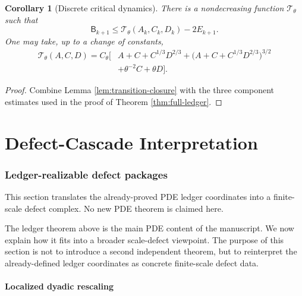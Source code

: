 \documentclass[11pt]{article}
\numberwithin{equation}{section}
\newtheorem{corollary}[theorem]{Corollary}
\newcommand{\Bbad}{\mathsf B}
\begin{document}
\begin{corollary}[Discrete critical dynamics]\label{cor:discrete-dynamics}
There is a nondecreasing function $\mathcal T_\theta$ such that
\[
\Bbad_{k+1}\leq \mathcal T_\theta(A_k,C_k,D_k)-2E_{k+1}.
\]
One may take, up to a change of constants,
\begin{align*}
\mathcal T_\theta(A,C,D)
=C_\theta\Big[&A+C+C^{1/3}D^{2/3}
+\big(A+C+C^{1/3}D^{2/3}\big)^{3/2}\\
&+\theta^{-2}C+\theta D\Big].
\end{align*}
\end{corollary}

\begin{proof}
Combine Lemma \ref{lem:transition-closure} with the three component estimates used in the proof of Theorem \ref{thm:full-ledger}.
\end{proof}


\part{Defect-Cascade Interpretation}
\section{Ledger-realizable defect packages}\label{sec:ledger-defects}
\noindent This section translates the already-proved PDE ledger coordinates into a finite-scale defect complex.  No new PDE theorem is claimed here.

The ledger theorem above is the main PDE content of the manuscript.  We now explain how it fits into a broader scale-defect viewpoint.  The purpose of this section is not to introduce a second independent theorem, but to reinterpret the already-defined ledger coordinates as concrete finite-scale defect data.

\subsection{Localized dyadic rescaling}\label{subsec:localized-dyadic-rescaling}
\end{document}
